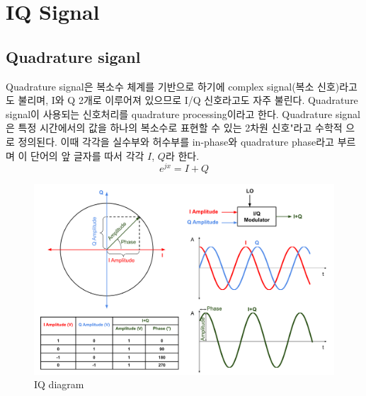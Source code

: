 \section{IQ Signal}
\subsection{Quadrature siganl}
    Quadrature signal은  복소수 체계를 기반으로 하기에 complex signal(복소 신호)라고도 불리며, I와 Q 2개로 이루어져 있으므로 I/Q 신호라고도 자주 불린다. Quadrature signal이 사용되는 신호처리를 quadrature processing이라고 한다.
    Quadrature signal은 특정 시간에서의 값을 하나의 복소수로 표현할 수 있는 2차원 신호"라고 수학적 으로 정의된다. 이때 각각을 실수부와 허수부를 in-phase와 quadrature phase라고 부르며 이 단어의 앞 글자를 따서 각각 $I$, $Q$라 한다.
    \begin{equation*}
        e^{jx} = I + Q
    \end{equation*}
    \vspace{-4mm}  
    \begin{figure}[!h]\centering
		\includegraphics[width=.75\textwidth]{image/week02/2-0-1.png}
		\caption{\small IQ diagram}
		\vspace{-10pt}
    \end{figure}
